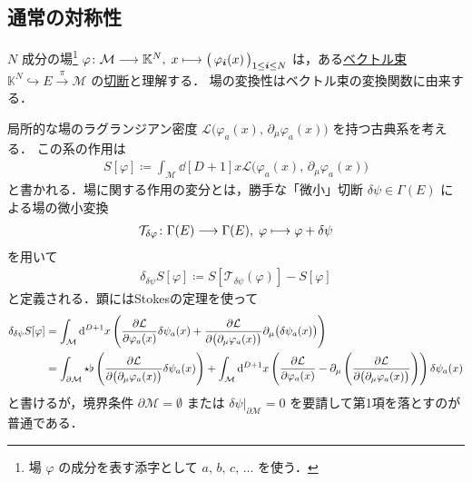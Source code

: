 \documentclass[TQFT_main]{subfiles}
\begin{document}
\subsection{通常の対称性}

$N$ 成分の場\footnote{場 $\varphi$ の成分を表す添字として $a,\, b,\, c,\, \dots$ を使う．} $\varphi \colon \mathcal{M} \longrightarrow \mathbb{K}^N,\; x \longmapsto \bigl(\, \varphi_{\bm{i}} (x) \,\bigr)_{1 \le \bm{i} \le N}$ は，ある\hyperref[def:vect]{ベクトル束} $\mathbb{K}^N \hookrightarrow E \xrightarrow{\pi} \mathcal{M}$ の\hyperref[def.section]{切断}と理解する．
場の変換性はベクトル束の変換関数に由来する．

局所的な場のラグランジアン密度 $\mathcal{L} \bigl( \varphi_a(x),\, \partial_\mu \varphi_a(x) \bigr)$ を持つ古典系を考える．
この系の作用は
\begin{align}
    S[\varphi] \coloneqq \int_{\mathcal{M}} \dd[D+1]{x} \mathcal{L} \bigl( \varphi_a(x),\, \partial_\mu\varphi_a(x) \bigr) 
\end{align}
と書かれる．場に関する作用の変分とは，勝手な「微小」切断 $\delta\psi \in \Gamma(E)$ による場の微小変換
\begin{align}
    \mathcal{T}_{\delta\varphi} \colon \Gamma (E) \longrightarrow \Gamma (E),\; \varphi \longmapsto \varphi + \delta\psi
\end{align}
を用いて
\begin{align}
    \delta_{\delta\psi} S[\varphi] \coloneqq S[\mathcal{T}_{\delta\psi} (\varphi)] - S[\varphi]
\end{align}
と定義される．顕にはStokesの定理を使って
\begin{align}
    \label{eq:var-action}
    \delta_{\delta \psi} S[\varphi] 
    &= \int_{\mathcal{M}} \dd[D+1]{x} \left( \pdv{\mathcal{L}}{\varphi_a(x)} \delta \psi_a (x) + \pdv{\mathcal{L}}{\bigl(\partial_\mu \varphi_a(x)\bigr)} \partial_\mu \bigl(\delta\psi_a(x)\bigr) \right) \\
    &= \int_{\partial\mathcal{M}} \star \flat\left(\pdv{\mathcal{L}}{\bigl(\partial_\mu \varphi_a(x)\bigr)} \delta\psi_a(x)\right) +  \int_{\mathcal{M}} \dd[D+1]{x} \left( \pdv{\mathcal{L}}{\varphi_a(x)} - \partial_\mu\left(\pdv{\mathcal{L}}{\bigl(\partial_\mu \varphi_a(x)\bigr)}\right) \right) \delta\psi_a(x)
\end{align}
と書けるが，境界条件 $\partial\mathcal{M} = \emptyset$ または $\delta \psi|_{\partial \mathcal{M}} = 0$ を要請して第1項を落とすのが普通である．
\end{document}
